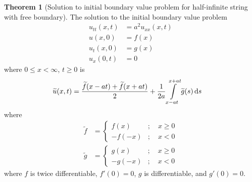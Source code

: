 \documentclass[titlepage, fleqn, a4paper, 12pt, twoside]{article}
\theoremstyle{definition}
\theoremstyle{theorem}
\newtheorem{theorem}{Theorem}
\renewcommand{\tilde}{\widetilde}
\begin{document}
\begin{theorem}[Solution to initial boundary value problem for half-infinite string with free boundary]
	The solution to the initial boundary value problem
	\begin{align*}
		u_{t t}(x,t) & = a^2 u_{x x}(x,t) \\
		u(x,0)       & = f(x)             \\
		u_t(x,0)     & = g(x)             \\
		u_x(0,t)     & = 0
	\end{align*}
	where $0 \le x < \infty$, $t \ge 0$ is
	\begin{align*}
		\tilde{u}(x,t) & = \frac{\tilde{f}(x - a t) + \tilde{f}(x + a t)}{2} + \frac{1}{2 a} \int\limits_{x - a t}^{x + a t} \tilde{g}(s) \dif s
	\end{align*}
	where
	\begin{align*}
		\tilde{f} &=
			\begin{cases}
				f(x)   & ;\quad x \ge 0 \\
				-f(-x) & ;\quad x < 0
			\end{cases}\\
		\tilde{g} &=
			\begin{cases}
				g(x)   & ;\quad x \ge 0 \\
				-g(-x) & ;\quad x < 0
			\end{cases}
	\end{align*}
	where $f$ is twice differentiable, $f'(0) = 0$, $g$ is differentiable, and $g'(0) = 0$.
	\label{thm:Solution_to_initial_boundary_value_problem_for_half-infinite_string_with_free_boundary}
\end{theorem}
\end{document}
